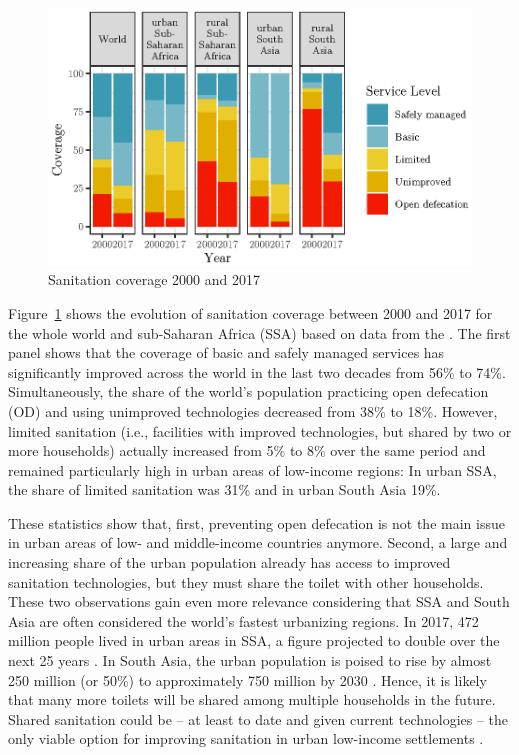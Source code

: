 \documentclass[natbib]{svjour3}                     %
\begin{document}
\begin{figure}[ht]
    \centering
    \includegraphics[width=\textwidth]{figures/coverage_plot.eps}
    \caption{Sanitation coverage 2000 and 2017 \citep{JMP2018}}
    \label{fig:coverage}
\end{figure}

Figure~\ref{fig:coverage} shows the evolution of sanitation coverage between 2000 and 2017 for the whole world and sub-Saharan Africa (SSA) based on data from the \cite{JMP2018}. The first panel shows that the coverage of basic and safely managed services has significantly improved across the world in the last two decades from 56\% to 74\%. Simultaneously, the share of the world's population practicing open defecation (OD) and using unimproved technologies decreased from 38\% to 18\%. However, limited sanitation (i.e., facilities with improved technologies, but shared by two or more households) actually increased from 5\% to 8\% over the same period and remained particularly high in urban areas of low-income regions: In urban SSA, the share of limited sanitation was 31\% and in urban South Asia 19\%.

These statistics show that, first, preventing open defecation is not the main issue in urban areas of low- and middle-income countries anymore. Second, a large and increasing share of the urban population already has access to improved sanitation technologies, but they must share the toilet with other households. These two observations gain even more relevance considering that SSA and South Asia are often considered the world's fastest urbanizing regions. In 2017, 472 million people lived in urban areas in SSA, a figure projected to double over the next 25 years \citep{Lall2017}. In South Asia, the urban population is poised to rise by almost 250 million (or 50\%) to approximately 750 million by 2030 \citep{Ellis2015, TheWorldBank2020}. Hence, it is likely that many more toilets will be shared among multiple households in the future. Shared sanitation could be -- at least to date and given current technologies -- the only viable option for improving sanitation in urban low-income settlements \citep{Schouten2010}.
\end{document}
